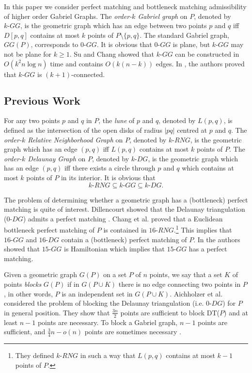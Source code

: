 \documentclass[11pt,a4paper]{article}
\newcommand{\kDG}[2]{$#1\text{-}DG#2$}
\newcommand{\kGG}[2]{$#1\text{-}GG#2$}
\newcommand{\kRNG}[2]{$#1\text{-}RNG#2$}
\newcommand{\CD}[2]{D[#1,#2]}
\begin{document}
In this paper we consider perfect matching and bottleneck matching admissibility of higher order Gabriel Graphs. The {\em order-$k$ Gabriel graph} on $P$, denoted by \kGG{k}{}, is the geometric graph which has an edge between two points $p$ and $q$ iff $\CD{p}{q}$ contains at most $k$ points of $P\setminus\{p,q\}$. The standard Gabriel graph, $GG(P)$, corresponds to \kGG{0}{}. It is obvious that \kGG{0}{} is plane, but \kGG{k}{} may not be plane for $k\ge 1$. Su and Chang \cite{Su1990} showed that \kGG{k}{} can be constructed in $O(k^2n\log n)$ time and contains $O(k(n-k))$ edges. In \cite{Bose2013}, the authors proved that \kGG{k}{} is $(k+1)$-connected.
\subsection{Previous Work}
For any two points $p$ and $q$ in $P$, the {\em lune} of $p$ and $q$, denoted by $L(p,q)$, is defined as the intersection of the open disks of radius $|pq|$ centred at $p$ and $q$.
The {\em order-$k$ Relative Neighborhood Graph} on $P$, denoted by \kRNG{k}{}, is the geometric graph which has an edge $(p,q)$ iff $L(p,q)$ contains at most $k$ points of $P$.  
The {\em order-$k$ Delaunay Graph} on $P$, denoted by \kDG{k}{}, is the geometric graph which has an edge $(p,q)$ iff there exists a circle through $p$ and $q$ which contains at most $k$ points of $P$ in its interior. 
It is obvious that $$\text{\kRNG{k}{}}\subseteq\text{\kGG{k}{}}\subseteq\text{\kDG{k}{}}.$$

The problem of determining whether a geometric graph has a (bottleneck) perfect matching is quite of interest. Dillencourt showed that the Delaunay triangulation (\kDG{0}{}) admits a perfect matching \cite{Dillencourt1990}. Chang et al. \cite{Chang1992} proved that a Euclidean bottleneck perfect matching of $P$ is contained in \kRNG{16}{}.\footnote{They defined \kRNG{k}{} in such a way that $L(p,q)$ contains at most $k-1$ points of $P$.} This implies that \kGG{16}{} and \kDG{16}{} contain a (bottleneck) perfect matching of $P$. In \cite{Abellanas2009} the authors showed that \kGG{15}{} is Hamiltonian which implies that \kGG{15}{} has a perfect matching. 

Given a geometric graph $G(P)$ on a set $P$ of $n$ points, we say that a set $K$ of points {\em blocks} $G(P)$ if in $G(P\cup K)$ there is no edge connecting two points in $P$, in other words, $P$ is an independent set in $G(P\cup K)$.
Aichholzer et al.~\cite{Aichholzer2013} considered the problem of blocking the Delaunay triangulation (i.e. \kDG{0}{}) for $P$ in general position. They show that $\frac{3n}{2}$ points are sufficient to block DT($P$) and at least $n-1$ points are necessary. To block a Gabriel graph, $n-1$ points are sufficient, and $\frac{3}{4}n-o(n)$ points are sometimes necessary \cite{Aronov2013}.
\end{document}
